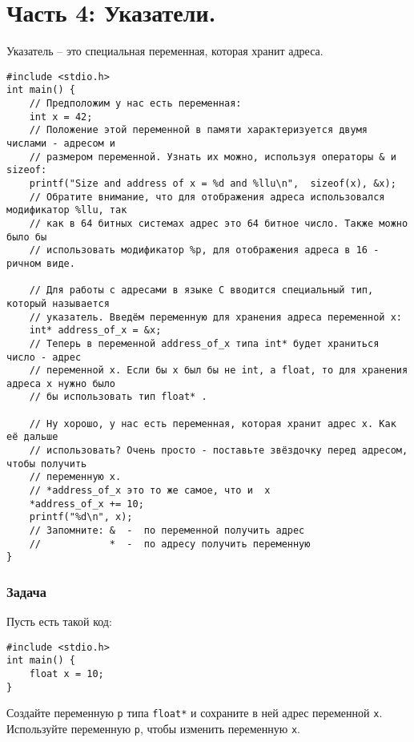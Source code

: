 \documentclass{article}
\begin{document}
\section*{Часть 4: Указатели.}
Указатель -- это специальная переменная, которая хранит адреса.
\begin{lstlisting}
#include <stdio.h>
int main() { 
    // Предположим у нас есть переменная:
    int x = 42; 
    // Положение этой переменной в памяти характеризуется двумя числами - адресом и 
    // размером переменной. Узнать их можно, используя операторы & и sizeof:
    printf("Size and address of x = %d and %llu\n",  sizeof(x), &x);
    // Обратите внимание, что для отображения адреса использовался модификатор %llu, так 
    // как в 64 битных системах адрес это 64 битное число. Также можно было бы 
    // использовать модификатор %p, для отображения адреса в 16 - ричном виде.
    
    // Для работы с адресами в языке C вводится специальный тип, который называется 
    // указатель. Введём переменную для хранения адреса переменной x:
    int* address_of_x = &x;
    // Теперь в переменной address_of_x типа int* будет храниться число - адрес 
    // переменной x. Если бы x был бы не int, а float, то для хранения адреса x нужно было 
    // бы использовать тип float* .
    
    // Ну хорошо, у нас есть переменная, которая хранит адрес x. Как её дальше 
    // использовать? Очень просто - поставьте звёздочку перед адресом, чтобы получить 
    // переменную x.
    // *address_of_x это то же самое, что и  x
    *address_of_x += 10;
    printf("%d\n", x);
    // Запомните: &  -  по переменной получить адрес
    //            *  -  по адресу получить переменную
} 
\end{lstlisting}

\subsubsection*{Задача}
Пусть есть такой код:
\begin{lstlisting}
#include <stdio.h>
int main() { 
    float x = 10;
} 
\end{lstlisting}
Создайте переменную \texttt{p} типа \texttt{float*} и сохраните в ней адрес переменной \texttt{x}. Используйте переменную \texttt{p}, чтобы изменить переменную \texttt{x}.
\end{document}
